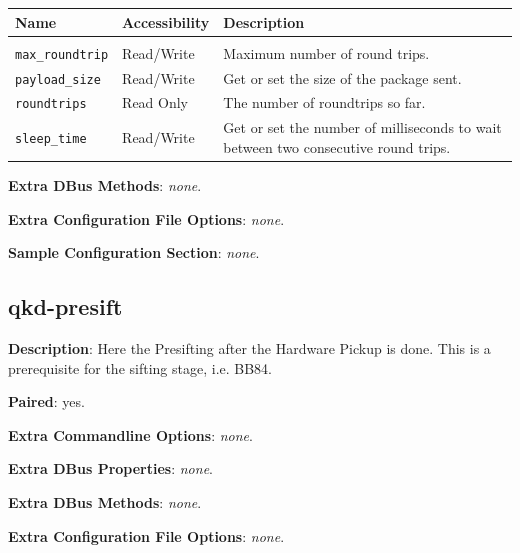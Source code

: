 \begin{tabular}{llp{7cm}}

Name                        & Accessibility &   Description \\
\hline
\\
\texttt{max\_roundtrip}     & Read/Write    &   Maximum number of round trips. \\ [0.5em]
\texttt{payload\_size}      & Read/Write    &   Get or set the size of the package sent. \\ [0.5em]
\texttt{roundtrips}         & Read Only     &   The number of roundtrips so far. \\ [0.5em]
\texttt{sleep\_time}        & Read/Write    &   Get or set the number of milliseconds to wait between two consecutive round trips. \\ [0.5em]

\end{tabular}

\bigskip

\noindent \textbf{Extra DBus Methods}: \emph{none}.

\bigskip

\noindent \textbf{Extra Configuration File Options}: \emph{none}.

\bigskip

\noindent \textbf{Sample Configuration Section}:  \emph{none}. 

\clearpage


\subsection{qkd-presift}
\label{subsec:qkd-presift}

\textbf{Description}: Here the Presifting after the Hardware Pickup is done. This is a prerequisite for the sifting stage, i.e. BB84.

\bigskip

\noindent \textbf{Paired}: yes.

\bigskip

\noindent \textbf{Extra Commandline Options}: \emph{none}.

\bigskip

\noindent \textbf{Extra DBus Properties}: \emph{none}.

\bigskip

\noindent \textbf{Extra DBus Methods}: \emph{none}.

\bigskip

\noindent \textbf{Extra Configuration File Options}: \emph{none}.

